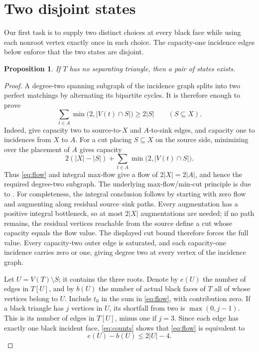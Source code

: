 \documentclass[11pt]{article}
\newtheorem{proposition}[theorem]{Proposition}
\theoremstyle{remark}
\newcommand{\abs}[1]{\left|#1\right|}
\numberwithin{equation}{section}
\begin{document}
\section{Two disjoint states}\label{sec:pairs}

Our first task is to supply two distinct choices at every black face
while using each nonroot vertex exactly once in each choice. The capacity-one
incidence edges below enforce that the two states are disjoint.

\begin{proposition}\label{prop:pairs}
If \(T\) has no separating triangle, then a pair of states exists.
\end{proposition}

\begin{proof}
A degree-two spanning subgraph of the incidence graph splits
into two perfect matchings by alternating its bipartite cycles.
It is therefore enough to prove
\begin{equation}\label{eq:flow}
 \sum_{t\in A}\min\bigl(2,\abs{V(t)\cap S}\bigr)\ge2\abs S
 \qquad(S\subseteq X).
\end{equation}
Indeed, give capacity two to source-to-\(X\) and
\(A\)-to-sink edges, and capacity one to incidences from \(X\)
to \(A\). For a cut placing \(S\subseteq X\) on the source side,
minimizing over the placement of \(A\) gives capacity
\[
 2(\abs X-\abs S)+
 \sum_{t\in A}\min\bigl(2,\abs{V(t)\cap S}\bigr).
\]
Thus \eqref{eq:flow} and integral max-flow give a flow of
\(2\abs X=2\abs A\), and hence the required degree-two subgraph.
The underlying max-flow/min-cut principle is due to
\citet{FF1956}. For completeness, the integral conclusion follows
by starting with zero
flow and augmenting along residual source--sink paths. Every augmentation
has a positive integral bottleneck, so at most \(2\abs X\) augmentations
are needed; if no path remains, the residual vertices reachable from the
source define a cut whose capacity equals the flow value. The displayed
cut bound therefore forces the full value. Every capacity-two outer edge
is saturated, and each capacity-one incidence carries zero or one,
giving degree two at every vertex of the incidence graph.

Let \(U=V(T)\setminus S\); it contains the three roots.
Denote by \(e(U)\) the number of edges in \(T[U]\), and by
\(b(U)\) the number of actual black faces of \(T\) all of whose
vertices belong to \(U\). Include \(t_0\) in the sum in
\eqref{eq:flow}, with contribution zero. If a black triangle
has \(j\) vertices in \(U\), its shortfall from two is
\(\max(0,j-1)\). This is its number of edges in \(T[U]\), minus
one if \(j=3\). Since each edge has exactly one black incident
face, \eqref{eq:counts} shows that \eqref{eq:flow} is equivalent to
\begin{equation}\label{eq:density}
 e(U)-b(U)\le2\abs U-4.
\end{equation}


\end{proof}
\end{document}

